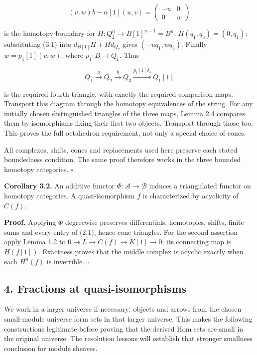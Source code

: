 \documentclass[
  english,
  11pt,
  a4paper,
]{article}
\begin{document}
\[(v,w)b-\alpha[1](u,v)=\begin{pmatrix}-u&0\\0&w\end{pmatrix}\]

is the homotopy boundary for \(H:Q_2^n\to B[1]^{n-1}=B^n\),
\(H(q_1,q_3)=(0,q_1)\): substituting (3.1) into \(d_{B[1]}H+Hd_{Q_2}\)
gives \((-u q_1,w q_3)\). Finally \(w=p_1[1](v,w)\), where
\(p_1:B\to Q_1\). Thus

\[Q_1\xrightarrow aQ_2\xrightarrow bQ_3
\xrightarrow{p_1[1]\delta_3}Q_1[1]\]

is the required fourth triangle, with exactly the required comparison
maps. Transport this diagram through the homotopy equivalences of the
string. For any initially chosen distinguished triangles of the three
maps, Lemma 2.4 compares them by isomorphisms fixing their first two
objects. Transport through those too. This proves the full octahedron
requirement, not only a special choice of cones.

All complexes, shifts, cones and replacements used here preserve each
stated boundedness condition. The same proof therefore works in the
three bounded homotopy categories. \(\square\)

\textbf{Corollary 3.2.} An additive functor
\(\Phi:\mathcal A\to\mathcal B\) induces a triangulated functor on
homotopy categories. A quasi-isomorphism \(f\) is characterized by
acyclicity of \(C(f)\).

\textbf{Proof.} Applying \(\Phi\) degreewise preserves differentials,
homotopies, shifts, finite sums and every entry of (2.1), hence cone
triangles. For the second assertion apply Lemma 1.2 to
\(0\to L\to C(f)\to K[1]\to0\); its connecting map is \(H(f[1])\).
Exactness proves that the middle complex is acyclic exactly when each
\(H^n(f)\) is invertible. \(\square\)

\subsection{4. Fractions at
quasi-isomorphisms}\label{complexes-cones-and-localization--4-fractions-at-quasi-isomorphisms}

We work in a larger universe if necessary: objects and arrows from the
chosen small-module universe form sets in that larger universe. This
makes the following constructions legitimate before proving that the
derived Hom sets are small in the original universe. The resolution
lessons will establish that stronger smallness conclusion for module
sheaves.
\end{document}
